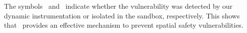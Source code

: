 The symbols~\vulprevented{} and~\vulisolated{} indicate whether the vulnerability was detected by our dynamic instrumentation or isolated in the sandbox, respectively.
This shows that~\systemname{} provides an effective mechanism to prevent spatial safety vulnerabilities.

% 







